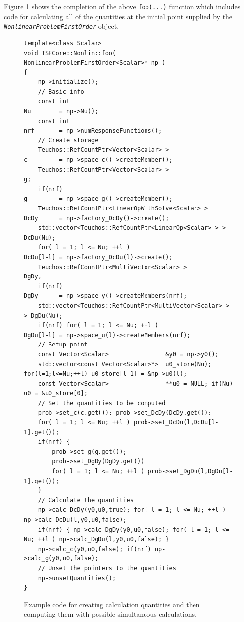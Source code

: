 Figure \ref{tsfcore:nonlin:fig:foo} shows the completion of the above
\texttt{foo(...)} function which includes code for calculating all of the
quantities at the initial point supplied by the
\texttt{\textit{Nonlinear\-Problem\-First\-Order}} object.
%
{\bsinglespace
\begin{figure}
\begin{minipage}{\textwidth}
{\scriptsize\begin{verbatim}
template<class Scalar>
void TSFCore::Nonlin::foo( NonlinearProblemFirstOrder<Scalar>* np )
{
    np->initialize();
    // Basic info
    const int                                                Nu        = np->Nu();
    const int                                                nrf       = np->numResponseFunctions();
    // Create storage
    Teuchos::RefCountPtr<Vector<Scalar> >                    c         = np->space_c()->createMember();
    Teuchos::RefCountPtr<Vector<Scalar> >                    g;
    if(nrf)                                                  g         = np->space_g()->createMember();
    Teuchos::RefCountPtr<LinearOpWithSolve<Scalar> >         DcDy      = np->factory_DcDy()->create();
    std::vector<Teuchos::RefCountPtr<LinearOp<Scalar> > >    DcDu(Nu);
    for( l = 1; l <= Nu; ++l )                               DcDu[l-l] = np->factory_DcDu(l)->create();
    Teuchos::RefCountPtr<MultiVector<Scalar> >               DgDy;
    if(nrf)                                                  DgDy      = np->space_y()->createMembers(nrf);
    std::vector<Teuchos::RefCountPtr<MultiVector<Scalar> > > DgDu(Nu);
    if(nrf) for( l = 1; l <= Nu; ++l )                       DgDu[l-l] = np->space_u(l)->createMembers(nrf);
    // Setup point
    const Vector<Scalar>                &y0 = np->y0();
    std::vector<const Vector<Scalar>*>  u0_store(Nu); for(l=1;l<=Nu;++l) u0_store[l-1] = &np->u0(l);
    const Vector<Scalar>                **u0 = NULL; if(Nu) u0 = &u0_store[0];
    // Set the quantities to be computed
    prob->set_c(c.get()); prob->set_DcDy(DcDy.get());
    for( l = 1; l <= Nu; ++l ) prob->set_DcDu(l,DcDu[l-1].get());
    if(nrf) {
        prob->set_g(g.get());
        prob->set_DgDy(DgDy.get());
        for( l = 1; l <= Nu; ++l ) prob->set_DgDu(l,DgDu[l-1].get());
    }
    // Calculate the quantities
    np->calc_DcDy(y0,u0,true); for( l = 1; l <= Nu; ++l ) np->calc_DcDu(l,y0,u0,false);
    if(nrf) { np->calc_DgDy(y0,u0,false); for( l = 1; l <= Nu; ++l ) np->calc_DgDu(l,y0,u0,false); }
    np->calc_c(y0,u0,false); if(nrf) np->calc_g(y0,u0,false);
    // Unset the pointers to the quantities
    np->unsetQuantities();
}
\end{verbatim}}
\end{minipage}
\caption{
\label{tsfcore:nonlin:fig:foo}
Example code for creating calculation quantities and then computing
them with possible simultaneous calculations.
}
\end{figure}
\esinglespace}
